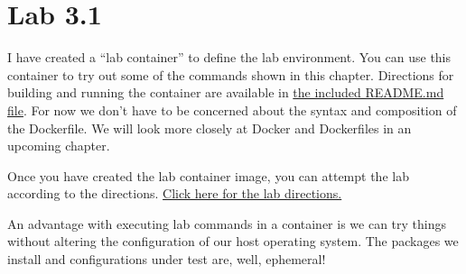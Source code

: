 \section{Lab 3.1}

\justify{}
I have created a ``lab container'' to define the lab environment. You can use this container to try out some of the
commands shown in this chapter. Directions for building and running the container are available in 
\href{https://github.com/devsecfranklin/devsecops-tactical-workbook/tree/main/code/chapter-three}{the included README.md file}.
For now we don't have to be concerned about the syntax and composition of the Dockerfile. We will look more closely
at Docker and Dockerfiles in an upcoming chapter.

\justify{}
Once you have created the lab container image, you can attempt the lab according to the directions.
\href{https://github.com/devsecfranklin/devsecops-tactical-workbook/tree/main/code/lab-3.1.md}{Click here for the lab directions.}

\justify{}
An advantage with executing lab commands in a container is we can try things without altering the configuration of
our host operating system. The packages we install and configurations under test are, well, ephemeral!
